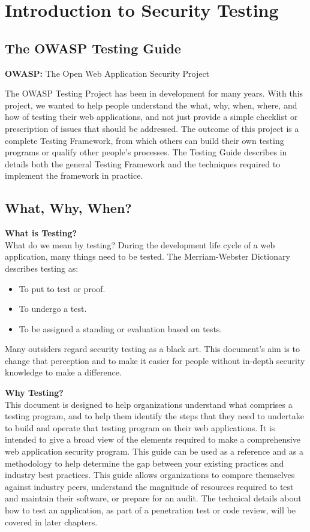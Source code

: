 \chapter{Introduction to Security Testing}
	\clearpage
	\section{The OWASP Testing Guide}
		{\bf OWASP:} The Open Web Application Security Project

		The OWASP Testing Project has been in development for many years. With this project, 
		we wanted to help people understand the what, why, when, where, and how of testing their 
		web applications, and not just provide a simple checklist or prescription of issues 
		that should be addressed. The outcome of this project is a complete Testing Framework, 
		from which others can build their own testing programs or qualify other people’s 
		processes. The Testing Guide describes in details both the general Testing Framework and 
		the techniques required to implement the framework in practice.

		\section{What, Why, When?}

		{\bf What is Testing?} \\
		What do we mean by testing? During the development life cycle of a web application, 
		many things need to be tested. The Merriam-Webster Dictionary describes testing as:
			\begin{itemize}
				\item To put to test or proof.
				\item To undergo a test.
				\item To be assigned a standing or evaluation based on tests.
			\end{itemize}
		Many outsiders regard security testing as a black art. This document’s aim is to
		change that perception and to make it easier for people without in-depth security 
		knowledge to make a difference.

		{\bf Why Testing?} \\
		This document is designed to help organizations understand what comprises a testing 
		program, and to help them identify the steps that they need to undertake to build 
		and operate that testing program on their web applications. 
		It is intended to give a broad view of the elements required to make a comprehensive 
		web application security program. 
		This guide can be used as a reference and as a methodology to help determine the gap 
		between your existing practices and industry best practices. 
		This guide allows organizations to compare themselves against industry peers, understand 
		the magnitude of resources required to test and maintain their software, or prepare for 
		an audit. 
		The technical details about how to test an application, as part of a penetration test or code review, will be covered in later chapters. 

